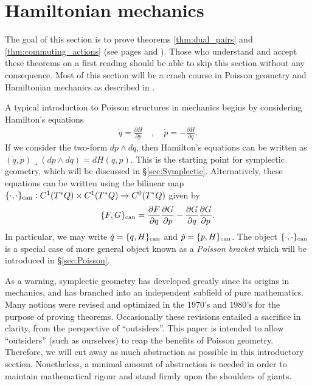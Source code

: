 \documentclass[12pt]{amsart}
\newcommand{\pder}[2]{\ensuremath{\frac{\partial #1}{\partial #2}}}
\begin{document}
\section{Hamiltonian mechanics}
\label{sec:Hamiltonian}
The goal of this section is to prove theorems \ref{thm:dual_pairs}
and \ref{thm:commuting_actions} (see pages \pageref{thm:dual_pairs} and \pageref{thm:commuting_actions}).
Those who understand and accept these theorems on a first reading
should be able to skip this section without any consequence.
Most of this section will be a crash course in Poisson geometry
and Hamiltonian mechanics as described in \cite{FOM,MandS,Weinstein1983}.

A typical introduction to Poisson structures in mechanics
begins by considering Hamilton's equations
\begin{align*}
  \dot{q} = \pder{H}{p} \quad, \quad  \dot{p} = - \pder{H}{q}.
\end{align*}
If we consider the two-form $dp \wedge dq$, then Hamilton's equations
can be written as $(\dot{q},\dot{p}) \lrcorner (dp \wedge dq) = dH(q,p)$.
This is the starting point for symplectic geometry, which
will be discussed in \S \ref{sec:Symplectic}.
Alternatively, these equations can be written using the bilinear map $\{ \cdot , \cdot \}_{\rm can} : C^1( T^*Q) \times C^1(T^*Q) \to C^0(T^*Q)$
given by
\begin{align*}
  \{ F , G \}_{\rm can} = \pder{F}{q}\pder{G}{p} - \pder{G}{q} \pder{G}{p}.
\end{align*}
In particular, we may write $\dot{q} = \{ q , H \}_{\rm can}$ and $\dot{p} = \{ p , H\}_{\rm can}$.
The object $\{ \cdot , \cdot \}_{\rm can}$ is a special case of more general
object known as a \emph{Poisson bracket} which will be introduced in
\S \ref{sec:Poisson}.

As a warning, symplectic geometry has developed greatly
since its origins in mechanics, and
has branched into an independent subfield of pure mathematics.
Many notions were revised and optimized in the $1970$'s and $1980$'s for
the purpose of proving theorems.
Occasionally these revisions entailed a sacrifice
in clarity, from the perspective of ``outsiders''.
This paper is intended to allow ``outsiders''
(such as ourselves) to reap the benefits of Poisson geometry.
Therefore, we will cut away as much abstraction as possible in this introductory
section.
Nonetheless, a minimal amount of abstraction is needed in order to
maintain mathematical rigour and stand firmly upon the shoulders of giants.
\end{document}
